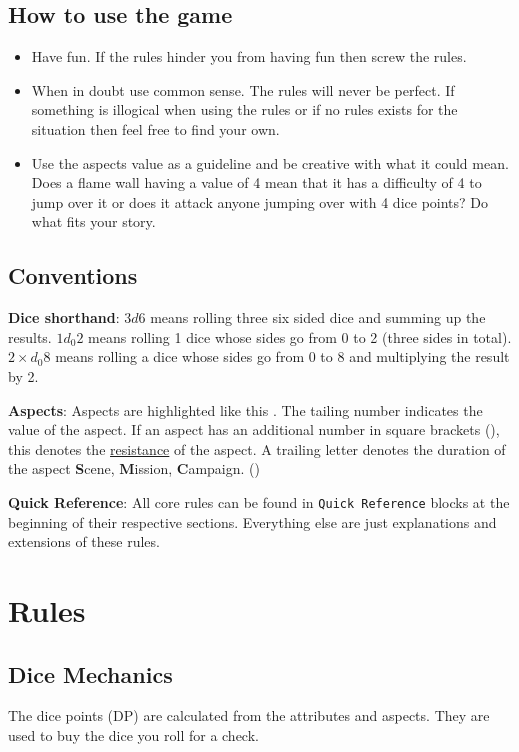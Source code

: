 \documentclass[11pt]{article}
\begin{document}
{\subsection{How to use the game}
\label{sec:org642c83f}


\begin{itemize}
\item Have fun. If the rules hinder you from having fun then screw the rules.
\item When in doubt use common sense. The rules will never be perfect. If something is illogical when using the rules or if no rules exists for the situation then feel free to find your own.
\item Use the aspects value as a guideline and be creative with what it could mean. Does a flame wall having a value of 4 mean that it has a difficulty of 4 to jump over it or does it attack anyone jumping over with 4 dice points? Do what fits your story.
\end{itemize}
\subsection{Conventions}
\label{sec:orgd2b7a0b}
\textbf{Dice shorthand}: \(3 d 6\) means rolling three six sided dice and summing up the results. \(1 d_0 2\) means rolling 1 dice whose sides go from 0 to 2 (three sides in total). \(2 \times d_0 8\) means rolling a dice whose sides go from 0 to 8 and multiplying the result by 2.

\textbf{Aspects}: Aspects are highlighted like this . The tailing number indicates the value of the aspect. If an aspect has an additional number in square brackets (), this denotes the \hyperref[sec:orgeb44c0a]{resistance} of the aspect. A trailing letter denotes the duration of the aspect \textbf{S}cene, \textbf{M}ission, \textbf{C}ampaign. ()

\textbf{Quick Reference}: All core rules can be found in \texttt{Quick Reference} blocks at the beginning of their respective sections. Everything else are just explanations and extensions of these rules.
\section{Rules}
\label{sec:org121838c}

\subsection{Dice Mechanics}
\label{sec:org34db9e3}
\begin{short}
The dice points (DP) are calculated from the attributes and aspects. They are used to buy the dice you roll for a check.


\end{short}}
\end{document}
